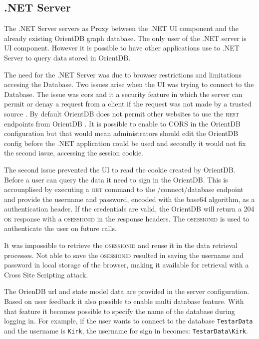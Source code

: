 \subsection{.NET Server}

The .NET Server servers as Proxy between the .NET UI component and the already existing OrientDB graph database. The only user of the .NET server is UI component. However it is possible to have other applications use to .NET Server to query data stored in OrientDB. 

The need for the .NET Server was due to browser restrictions and limitations accesing the Database. Two issues arise when the UI was trying to connect to the Database. The issue was \acrfull{cors} and it a security feature in which the server can permit or denay a request from a client if the request was not made by a trusted source \cite{cors}. By default OrientDB does not permit other websites to use the \textsc{rest} endpoints from OrientDB \cite{orientdb-webserver}. It is possible to enable to CORS in the OrientDB configuration but that would mean administrators should edit the OrientDB config before the .NET application could be used and secondly it would not fix the second issue, accessing the session cookie.

The second issue prevented the UI to read the cookie created by OrientDB. Before a user can query the data it need to sign in the OrientDB. This is accounplised by executing a \textsc{get} command to the /connect/database endpoint and provide the username and password, encoded with the base64 algorithm, as a authentication header. If the credentials are valid, the OrientDB will return a \textsc{204 ok} response with a \textsc{osessionid} in the response headers. The \textsc{osessionid} is used to authenticate the user on future calls.

It was impossible to retrieve the \textsc{osessionid} and reuse it in the data retrieval processes. Not able to save the \textsc{osessionid} resulted in saving the username and password in local storage of the browser, making it available for retrieval with a Cross Site Scripting attack. 

The OrienDB url and \testar state model data are provided in the server configuration. Based on user feedback it also possible to enable multi database feature. With that feature it becomes possible to specify the name of the database during logging in. For example, if the user wants to connect to the database \verb|TestarData| and the username is \verb|Kirk|, the username for sign in becomes: \verb|TestarData\Kirk|.

